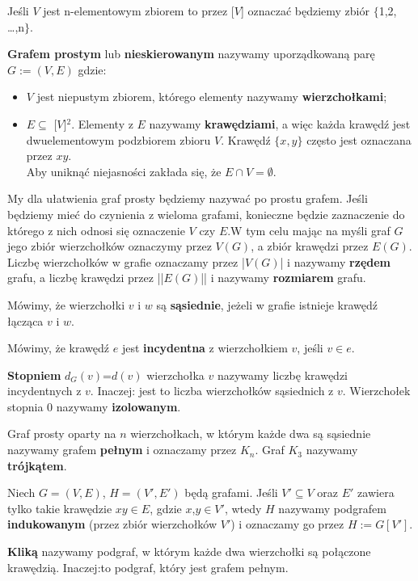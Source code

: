 \documentclass[miz,woman]{mgrwms}
\begin{document}
Jeśli $V$ jest n-elementowym zbiorem to przez [$V$] oznaczać będziemy zbiór $\{$1,2, \dots ,n$\}$.
\begin{defi}
\textbf{Grafem prostym} lub \textbf{nieskierowanym} nazywamy uporządkowaną parę \\$G:=(V,E)$ gdzie:\\
\begin{itemize}
 \item $V$ jest niepustym zbiorem, którego elementy nazywamy \textbf{wierzchołkami};
 \item $E \subseteq$ [$V$]$^2$. Elementy z $E$ nazywamy \textbf{krawędziami}, a więc każda krawędź jest dwuelementowym
podzbiorem zbioru $V$. Krawędź $\{x,y\}$ często jest oznaczana przez $xy$.\\
Aby uniknąć niejasności zakłada się, że $E \cap V=\emptyset$.

\end{itemize}

\end{defi}
My dla ułatwienia graf prosty będziemy nazywać po prostu grafem.
Jeśli będziemy mieć do czynienia z wieloma grafami, konieczne będzie zaznaczenie do którego z nich odnosi się oznaczenie
$V$ czy $E$.W tym celu mając na myśli graf $G$ jego zbiór wierzchołków oznaczymy przez $V(G)$, a zbiór krawędzi przez $E(G)$.\\
Liczbę wierzchołków w grafie oznaczamy przez |$V(G)$| i nazywamy \textbf{rzędem} grafu, a liczbę krawędzi przez 
||$E(G)$|| i nazywamy \textbf{rozmiarem} grafu.\\
\begin{defi}
 Mówimy, że wierzchołki $v$ i $w$ są \textbf{sąsiednie}, jeżeli w grafie istnieje krawędź łącząca $v$ i $w$.
\end{defi}
\begin{defi}
 Mówimy, że krawędź $e$ jest \textbf{incydentna} z wierzchołkiem $v$, jeśli $v \in e$.
\end{defi}
\begin {defi}
 \textbf{Stopniem} $d_G(v)$=$d(v)$ wierzchołka $v$ nazywamy liczbę krawędzi incydentnych z $v$. Inaczej: jest to liczba
 wierzchołków sąsiednich z $v$. Wierzchołek stopnia 0 nazywamy \textbf{izolowanym}.
\end {defi}

\begin{defi}
 Graf prosty oparty na $n$ wierzchołkach, w którym każde dwa są sąsiednie nazywamy grafem \textbf{pełnym} i oznaczamy przez $K_n$. 
Graf $K_3$ nazywamy \textbf{trójkątem}.
\end{defi}
\begin{defi}
Niech $G=(V,E)$, $H=(V',E')$ będą grafami. Jeśli $V'\subseteq V$ oraz $E'$ zawiera tylko takie krawędzie $xy\in E$, gdzie 
$x$,$y \in V'$, wtedy $H$ nazywamy podgrafem \textbf{indukowanym} (przez zbiór wierzchołków $V'$) i oznaczamy go przez $H:=G[V']$.
\end{defi}
\begin{defi}
 \textbf{Kliką} nazywamy podgraf, w którym każde dwa wierzchołki są połączone krawędzią. Inaczej:to podgraf, który jest 
grafem pełnym.
\end{defi}
\end{document}
